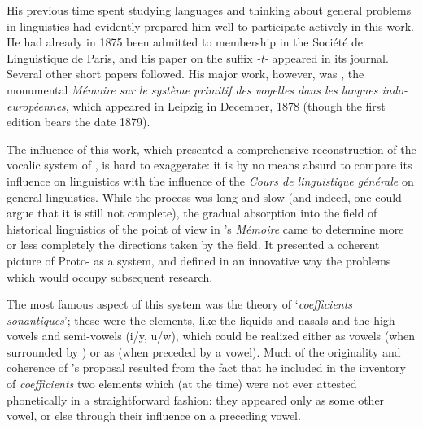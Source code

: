 His previous time spent studying languages and thinking about general
problems in linguistics had evidently prepared him well to participate
actively in this work. He had already in 1875 been admitted to
membership in the Société de Linguistique de Paris, and his paper on
the suffix \emph{-t-} appeared in its journal.  Several other short
papers followed. His major work, however, was
\citet{saussure:memoire}, the monumental \textsl{Mémoire sur le
  système primitif des voyelles dans les langues indo-européennes},
which appeared in {Leipzig} in December, 1878 (though the first edition
bears the date 1879).

The influence of this work, which presented a comprehensive
reconstruction of the vocalic system of , is hard to
exaggerate: it is by no means absurd to compare its influence on
 linguistics with the influence of the \textsl{Cours de
  linguistique générale} on general linguistics.  While the
process was long and slow (and indeed, one could argue that it is
still not complete), the gradual absorption into the field of
historical linguistics of the point of view in {\Saussure}'s
\textsl{Mémoire} came to determine more or less completely the
directions taken by the field.  It presented a coherent picture of
Proto- as a system, and defined in an innovative way the
problems which would occupy subsequent research.

The most famous aspect of this system was the theory of
`\emph{coefficients sonantiques}'; these were the elements, like
the liquids and nasals and the high vowels and semi-vowels (i/y, u/w),
which could be realized either as vowels (when surrounded by
) or as  (when preceded by a vowel).  Much of the
originality and coherence of {\Saussure}'s proposal resulted from the
fact that he included in the inventory of \emph{coefficients} two
elements which (at the time) were not ever attested phonetically in a
straightforward fashion: they appeared only as some other vowel, or
else through their influence on a preceding vowel.

